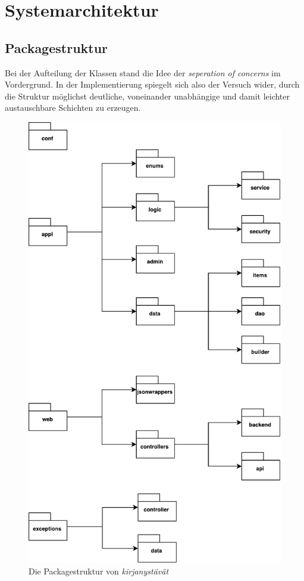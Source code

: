 \section{Systemarchitektur}

\subsection{Packagestruktur}

Bei der Aufteilung der Klassen stand die Idee der \textit{seperation of concerns} im Vordergrund. In der Implementierung spiegelt sich also der Versuch wider, durch die Struktur möglichst deutliche, voneinander unabhängige und damit leichter austauschbare Schichten zu erzeugen.


\begin{figure}[h]
	\centering
	\includegraphics[width=\linewidth]{files/packages}
	\caption{Die Packagestruktur von \textit{kirjanystävät}}
	\label{fig:packages}
\end{figure}
\FloatBarrier

